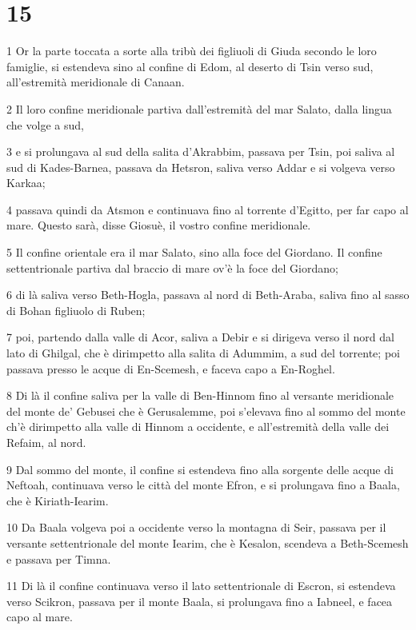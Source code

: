 \chapter{15}

\par 1 Or la parte toccata a sorte alla tribù dei figliuoli di Giuda secondo le loro famiglie, si estendeva sino al confine di Edom, al deserto di Tsin verso sud, all'estremità meridionale di Canaan.
\par 2 Il loro confine meridionale partiva dall'estremità del mar Salato, dalla lingua che volge a sud,
\par 3 e si prolungava al sud della salita d'Akrabbim, passava per Tsin, poi saliva al sud di Kades-Barnea, passava da Hetsron, saliva verso Addar e si volgeva verso Karkaa;
\par 4 passava quindi da Atsmon e continuava fino al torrente d'Egitto, per far capo al mare. Questo sarà, disse Giosuè, il vostro confine meridionale.
\par 5 Il confine orientale era il mar Salato, sino alla foce del Giordano. Il confine settentrionale partiva dal braccio di mare ov'è la foce del Giordano;
\par 6 di là saliva verso Beth-Hogla, passava al nord di Beth-Araba, saliva fino al sasso di Bohan figliuolo di Ruben;
\par 7 poi, partendo dalla valle di Acor, saliva a Debir e si dirigeva verso il nord dal lato di Ghilgal, che è dirimpetto alla salita di Adummim, a sud del torrente; poi passava presso le acque di En-Scemesh, e faceva capo a En-Roghel.
\par 8 Di là il confine saliva per la valle di Ben-Hinnom fino al versante meridionale del monte de' Gebusei che è Gerusalemme, poi s'elevava fino al sommo del monte ch'è dirimpetto alla valle di Hinnom a occidente, e all'estremità della valle dei Refaim, al nord.
\par 9 Dal sommo del monte, il confine si estendeva fino alla sorgente delle acque di Neftoah, continuava verso le città del monte Efron, e si prolungava fino a Baala, che è Kiriath-Iearim.
\par 10 Da Baala volgeva poi a occidente verso la montagna di Seir, passava per il versante settentrionale del monte Iearim, che è Kesalon, scendeva a Beth-Scemesh e passava per Timna.
\par 11 Di là il confine continuava verso il lato settentrionale di Escron, si estendeva verso Scikron, passava per il monte Baala, si prolungava fino a Iabneel, e facea capo al mare.
